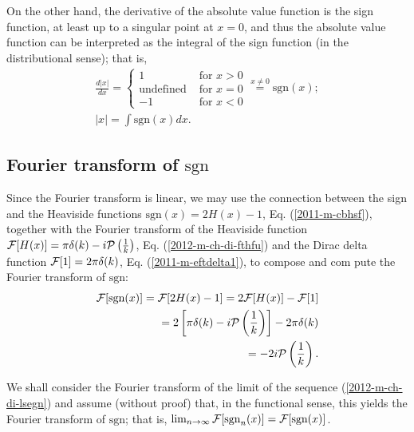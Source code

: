 On the other hand, the derivative of the absolute value function is the sign function, at least up to a singular point at $x=0$,
and thus the absolute value function can be interpreted as the integral of the sign function (in the distributional sense);
that is,
\begin{equation}
\begin{split}
\frac{d \left|x\right|}{dx} =
\left\{
\begin{array}{rl}
1&\textrm{ for } x > 0\\
\textrm{undefined}&\textrm{ for } x = 0\\
-1&\textrm{ for } x < 0
\end{array}
\right.
\stackrel{x\neq 0}{=}
\textrm{sgn} (x)
;\\
\left|x\right| =  \int \textrm{sgn} (x) dx.
\end{split}
 \end{equation}



\subsection{Fourier transform of $\textrm{sgn}$}

Since the Fourier transform is linear,
we may use the connection between the sign and the Heaviside functions $\textrm{sgn}(x) = 2H(x) -1$, Eq. (\ref{2011-m-cbhsf}),
together with the
Fourier transform of the Heaviside function
${\cal F}[H(x)] =  \pi \delta (k)   -i {\cal P} \left(\frac{1}{k}\right)$,
Eq. (\ref{2012-m-ch-di-fthfu}) and the Dirac delta function
${\cal F}[1] = 2\pi \delta (k)$, Eq. (\ref{2011-m-eftdelta1}),
to compose and com
pute the Fourier transform  of $\textrm{sgn}$:
\begin{equation}
\begin{split}
{\cal F}[\textrm{sgn}(x)] = {\cal F}[2H(x) -1] = 2{\cal F}[H(x)] - {\cal F}[1]
\\ \qquad =
2 \left[\pi \delta (k)   -i {\cal P} \left(\frac{1}{k}\right)\right] -  2\pi \delta (k)
\\ \qquad =
-2i {\cal P} \left(\frac{1}{k}\right)
.
\end{split}
\label{2011-m-ch-di-fdsgnfu}
\end{equation}

We shall consider the Fourier transform of the limit of the sequence (\ref{2012-m-ch-di-lsegn})
and assume (without proof) that, in the functional sense,
this yields the   Fourier transform of $\textrm{sgn}$; that is,
$
\lim_{n\rightarrow \infty}
{\cal F}[ \textrm{sgn}_n(x) ]
=
{\cal F}[ \textrm{sgn}(x) ]
$.


